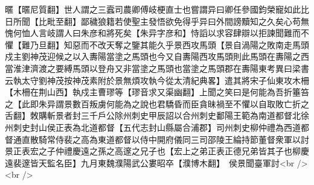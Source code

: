暱【暱尼質翻】世人謂之三蠧司農卿傅岐梗直士也嘗謂异曰卿任參國鈞榮寵如此比日所聞【比毗至翻】鄙穢狼籍若使聖主發悟欲免得乎异曰外間謗黷知之久矣心苟無愧何恤人言岐謂人曰朱彦和將死矣【朱异字彦和】恃謟以求容肆辯以拒諫聞難而不懼【難乃旦翻】知惡而不改天奪之鑒其能久乎景西攻馬頭【景自渦陽之敗南走馬頭戍主劉神茂迎候之以入夀陽當塗之馬頭也今又自夀陽西攻馬頭則此馬頭在夀陽之西當淮津濟渡之要縛馬頭以登舟又非當塗之馬頭也當塗之馬頭郡在夀陽東考異曰梁書云執太守劉神茂按神茂素附於景無煩攻執今從太清紀典畧】遣其將宋子仙東攻木柵【木柵在荆山西】執戍主曹璆等【璆音求又渠幽翻】上聞之笑曰是何能為吾折箠笞之【此即朱异謂景數百叛虜何能為之說也君驕昏而臣貪昧禍至不懼以自取敗亡折之舌翻】敇購斬景者封三千戶公除州刺史甲辰詔以合州刺史鄱陽王範為南道都督北徐州刺史封山侯正表為北道都督【五代志封山縣屬合浦郡】司州刺史柳仲禮為西道都督通直散騎常侍裴之高為東道都督以侍中開府儀同三司邵陵王綸持節董督衆軍以討景正表宏之子仲禮慶遠之孫之高邃之兄子也【宏上之弟正表正德兄弟皆其子也柳慶遠裴邃皆天監名臣】九月東魏濮陽武公婁昭卒【濮博木翻】　侯景聞臺軍討<br />
<br />
